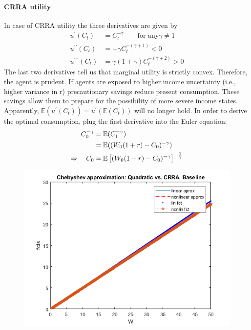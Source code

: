 \documentclass{article}
\begin{document}
\paragraph{CRRA utility}
In case of CRRA utility the three derivatives are given by
\begin{align*}
u^\prime(C_t) &= C_t^{-\gamma} \quad \quad \text{for any} \gamma \neq 1 \tag{Marginal utility}\\
u^{\prime\prime}(C_t) &= -\gamma C_t^{-(\gamma+1)} < 0 \tag{Risk aversion}\\
u^{\prime\prime\prime}(C_t) &= \gamma (1 + \gamma) C_t^{-(\gamma+2)} > 0 \tag{Prudence}
\end{align*}
The last two derivatives tell us that marginal utility is strictly convex. Therefore, the agent is prudent. If agents are exposed to higher income uncertainty (i.e., higher variance in r) precautionary savings reduce present consumption. These savings allow them to prepare for the possibility of more severe income states.\\

Apparently, $\mathbb{E}(u^\prime(C_t)) = u^\prime(\mathbb{E}(C_t))$ will no longer hold. In order to derive the optimal consumption, plug the first derivative into the Euler equation:
\begin{align*}
C_0^{-\gamma} &= \mathbb{E}(C_1^{-\gamma}) \notag \\
&= \mathbb{E}((W_0 (1+r) - C_0)^{-\gamma}) \notag \\
\Rightarrow \quad C_0 &= \mathbb{E}\left[(W_0 (1+r) - C_0)^{-\gamma}\right]^{-\frac{1}{\gamma}}
\end{align*}



\begin{figure}[h!]
\includegraphics[width = .8\textwidth, keepaspectratio]{ps4ex2fig1.png}
\end{figure}
\end{document}
